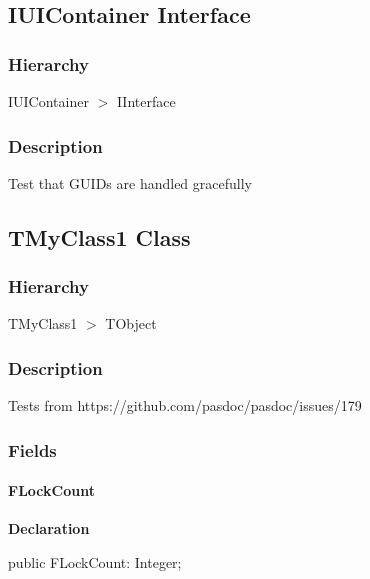 \documentclass{report}
\begin{document}
\subsection*{IUIContainer Interface}
\subsubsection*{\large{\textbf{Hierarchy}}\normalsize\hspace{1ex}\hfill}
IUIContainer {$>$} IInterface
\subsubsection*{\large{\textbf{Description}}\normalsize\hspace{1ex}\hfill}
Test that GUIDs are handled gracefully\subsection*{TMyClass1 Class}
\subsubsection*{\large{\textbf{Hierarchy}}\normalsize\hspace{1ex}\hfill}
TMyClass1 {$>$} TObject
\subsubsection*{\large{\textbf{Description}}\normalsize\hspace{1ex}\hfill}
Tests from https://github.com/pasdoc/pasdoc/issues/179\subsubsection*{\large{\textbf{Fields}}\normalsize\hspace{1ex}\hfill}
\paragraph*{FLockCount}\hspace*{\fill}

\begin{list}{}{
\setlength{\itemindent}{0cm}
\setlength{\listparindent}{0cm}
\setlength{\leftmargin}{\evensidemargin}
\addtolength{\leftmargin}{\tmplength}
\settowidth{\labelsep}{X}
\addtolength{\leftmargin}{\labelsep}
\setlength{\labelwidth}{\tmplength}
}
\begin{flushleft}
\item[\textbf{Declaration}\hfill]
\begin{ttfamily}
public FLockCount: Integer;\end{ttfamily}


\end{flushleft}
\end{list}
\end{document}
